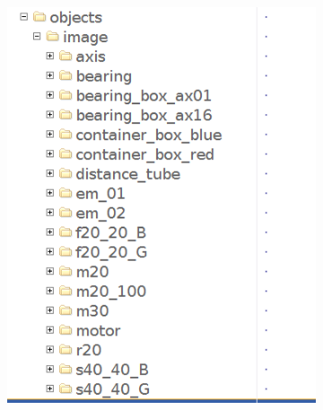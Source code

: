 \begin{center}
	\begin{figure}[!htb]
		\begin{subfigure}{.5\textwidth}
			\centering
			\includegraphics[width=1\linewidth]{images/folder_image}
			\label{Fig:fsila}
		\end{subfigure}
		\begin{subfigure}{.5\textwidth}
			\centering

\end{subfigure}
\end{figure}
\end{center}
